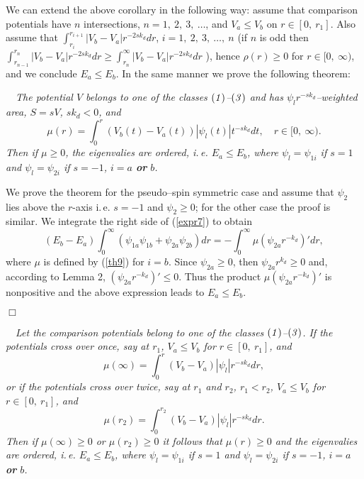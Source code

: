 \documentclass[amsmath,amssymb,superscriptaddress,showkeys, showpacs, aps, nofootinbib]{revtex4}
\begin{document}
\medskip

We can extend the above corollary in the following way: assume that comparison potentials have $n$ intersections, $n=1,\ 2,\ 3,\ \ldots$, and $V_a\le V_b$ on $r\in[0,\ r_1]$. Also assume that $\int_{r_i}^{r_{i+1}}|V_b-V_a|r^{-2sk_d}dr$, $i=1,\ 2,\ 3,\ \ldots,\ n$ (if $n$ is odd then $\int_{r_{n-1}}^{r_n}|V_b-V_a|r^{-2sk_d}dr\ge\int_{r_n}^\infty|V_b-V_a|r^{-2sk_d}dr$ ), hence $\rho(r)\ge 0$ for $r\in[0,\ \infty)$, and we conclude $E_a\le E_b$. In the same manner we prove the following theorem:

\medskip

 ~~{\it The potential $V$ belongs to one of the classes ${\it (1)}$--${\it (3)}$ and has $\psi_l r^{-sk_d}$--weighted area, $S=sV$, $sk_d<0$, and 
\begin{equation}\label{th9}
\mu(r)=\int_0^r(V_b(t)-V_a(t))|\psi_{l}(t)|t^{-sk_d}dt, \quad r\in [0,\ \infty).
\end{equation}
Then if $\mu\ge 0$, the eigenvalies are ordered, i.\,e. $E_a\le E_b$, where $\psi_l=\psi_{1i}$ if $s=1$ and $\psi_l=\psi_{2i}$ if $s=-1$, $i=a$ {\bf or} $b$.} 

\medskip

 We prove the theorem for the pseudo--spin symmetric case and assume that $\psi_2$ lies above the $r$-axis i.\,e. $s=-1$ and $\psi_2\ge 0$; for the other case the proof is similar. We integrate the right side of (\ref{expr7}) to obtain
\begin{equation*}
(E_b - E_a)\int_0^\infty (\psi_{1a}\psi_{1b} + \psi_{2a}\psi_{2b})dr=
-\int_0^\infty\mu\left(\psi_{2a}r^{-k_d}\right)'dr,       
\end{equation*}
where $\mu$ is defined by (\ref{th9}) for $i=b$. Since $\psi_{2a}\ge 0$, then $\psi_{2a} r^{k_d}\ge 0$ and, according to Lemma 2, $(\psi_{2a} r^{-k_d})'\le 0$. Thus the product $\mu\left(\psi_{2a}r^{-k_d}\right)'$ is nonpositive and the above expression leads to $E_a\le E_b$. 

\hfill $\Box$

\medskip

 ~~{\it Let the comparison potentials belong to one of the classes ${\it (1)}$--${\it (3)}$. If the potentials cross over once, say at $r_1$, $V_a\le V_b$ for $r\in [0,\ r_1]$, and
\begin{equation*}
\mu(\infty)=\int_0^r (V_b-V_a)|\psi_{l}|r^{-sk_d}dr,
\end{equation*}
or if the potentials cross over twice, say at $r_1$ and $r_2$, $r_1<r_2$, $V_a\le V_b$ for $r\in [0,\ r_1]$, and
\begin{equation*}
\mu(r_2)=\int_0^{r_2} (V_b-V_a)|\psi_{l}|r^{-sk_d}dr.
\end{equation*}
Then if $\mu(\infty)\ge 0$ or $\mu(r_2)\ge 0$ it follows that $\mu(r)\ge 0$ and the eigenvalies are ordered, i.\,e. $E_a\le E_b$, where $\psi_l=\psi_{1i}$ if $s=1$ and $\psi_l=\psi_{2i}$ if $s=-1$, $i=a$ {\bf or} $b$.} 
\end{document}
